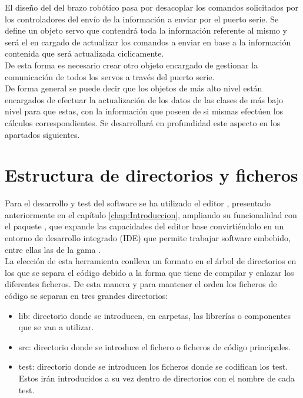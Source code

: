 El diseño del  del brazo robótico pasa por desacoplar los comandos solicitados por los controladores del envío de la información a enviar por el puerto serie. Se define un objeto servo que contendrá toda la información referente al mismo y será el en cargado de actualizar los comandos a enviar en base a la información contenida que será actualizada ciclicamente.
\\

De esta forma es necesario crear otro objeto encargado de gestionar la comunicación de todos los servos a través del puerto serie.
\\

De forma general se puede decir que los objetos de más alto nivel están encargados de efectuar la actualización de los datos de las clases de más bajo nivel para que estas, con la información que poseen de si mismas efectúen los cálculos correspondientes. Se desarrollará en profundidad este aspecto en los apartados siguientes.

\section{Estructura de directorios y ficheros} \label{sec:SW:estructura_dir}

Para el desarrollo y test del software se ha utilizado el editor , presentado anteriormente en el capítulo \ref{chap:Introduccion}, ampliando su funcionalidad con el paquete , que expande las capacidades del editor base convirtiéndolo en un entorno de desarrollo integrado (IDE) que permite trabajar software embebido, entre ellas las de la gama .
\\

La elección de esta herramienta conlleva un formato en el árbol de directorios en los que se separa el código debido a la forma que tiene de compilar y enlazar los diferentes ficheros. De esta manera y para mantener el orden los ficheros de código se separan en tres grandes directorios:

\begin{itemize}
    \item lib: directorio donde se introducen, en carpetas, las librerías o componentes que se van a utilizar.
    \item src: directorio donde se introduce el fichero o ficheros de código principales.
    \item test: directorio donde se introducen los ficheros donde se codifican los test. Estos irán introducidos a su vez dentro de directorios con el nombre de cada test.
\end{itemize}

